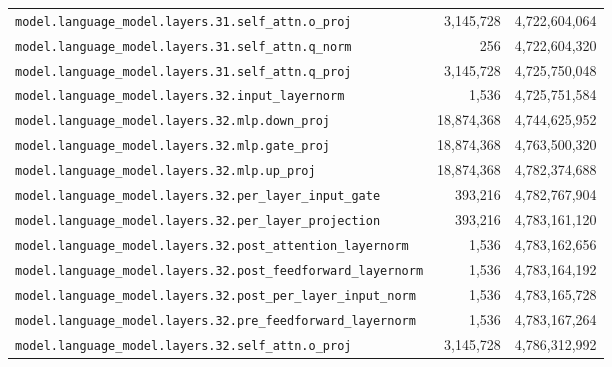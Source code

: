 \documentclass[10pt,a4paper]{article}
\theoremstyle{definition}
\begin{document}
\begin{appendices}
\begin{longtable}{p{9.5cm}rr}
\texttt{model.\allowbreak{}language\_model.\allowbreak{}layers.\allowbreak{}31.\allowbreak{}self\_attn.\allowbreak{}o\_proj} & 3,145,728 & 4,722,604,064 \\
\texttt{model.\allowbreak{}language\_model.\allowbreak{}layers.\allowbreak{}31.\allowbreak{}self\_attn.\allowbreak{}q\_norm} & 256 & 4,722,604,320 \\
\texttt{model.\allowbreak{}language\_model.\allowbreak{}layers.\allowbreak{}31.\allowbreak{}self\_attn.\allowbreak{}q\_proj} & 3,145,728 & 4,725,750,048 \\
\texttt{model.\allowbreak{}language\_model.\allowbreak{}layers.\allowbreak{}32.\allowbreak{}input\_layernorm} & 1,536 & 4,725,751,584 \\
\texttt{model.\allowbreak{}language\_model.\allowbreak{}layers.\allowbreak{}32.\allowbreak{}mlp.\allowbreak{}down\_proj} & 18,874,368 & 4,744,625,952 \\
\texttt{model.\allowbreak{}language\_model.\allowbreak{}layers.\allowbreak{}32.\allowbreak{}mlp.\allowbreak{}gate\_proj} & 18,874,368 & 4,763,500,320 \\
\texttt{model.\allowbreak{}language\_model.\allowbreak{}layers.\allowbreak{}32.\allowbreak{}mlp.\allowbreak{}up\_proj} & 18,874,368 & 4,782,374,688 \\
\texttt{model.\allowbreak{}language\_model.\allowbreak{}layers.\allowbreak{}32.\allowbreak{}per\_layer\_input\_gate} & 393,216 & 4,782,767,904 \\
\texttt{model.\allowbreak{}language\_model.\allowbreak{}layers.\allowbreak{}32.\allowbreak{}per\_layer\_projection} & 393,216 & 4,783,161,120 \\
\texttt{model.\allowbreak{}language\_model.\allowbreak{}layers.\allowbreak{}32.\allowbreak{}post\_attention\_layernorm} & 1,536 & 4,783,162,656 \\
\texttt{model.\allowbreak{}language\_model.\allowbreak{}layers.\allowbreak{}32.\allowbreak{}post\_feedforward\_layernorm} & 1,536 & 4,783,164,192 \\
\texttt{model.\allowbreak{}language\_model.\allowbreak{}layers.\allowbreak{}32.\allowbreak{}post\_per\_layer\_input\_norm} & 1,536 & 4,783,165,728 \\
\texttt{model.\allowbreak{}language\_model.\allowbreak{}layers.\allowbreak{}32.\allowbreak{}pre\_feedforward\_layernorm} & 1,536 & 4,783,167,264 \\
\texttt{model.\allowbreak{}language\_model.\allowbreak{}layers.\allowbreak{}32.\allowbreak{}self\_attn.\allowbreak{}o\_proj} & 3,145,728 & 4,786,312,992 \\

\end{longtable}
\end{appendices}
\end{document}
